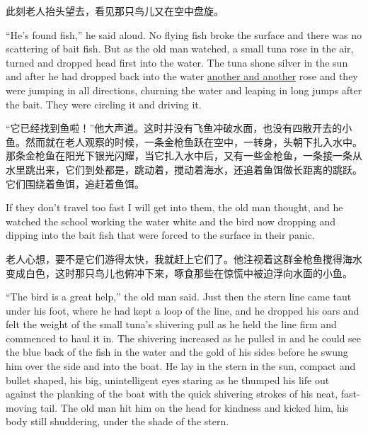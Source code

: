 \begin{paracol}{2}
\switchcolumn

此刻老人抬头望去，看见那只鸟儿又在空中盘旋。

\switchcolumn*

``He's found fish,'' he said aloud. No flying fish broke the surface and there
was no \gls{scattering} of bait fish. But as the old man watched, a small tuna
rose in the air, turned and dropped head first into the water. The tuna
\gls{shone} \gls{silver} in the sun and after he had dropped back into the water
\uline{another and another} rose and they were jumping in all \glspl{direction},
\gls{churning} the water and \gls{leaping} in long jumps after the bait. They
were circling it and driving it.

\switchcolumn

“它已经找到鱼啦！”他大声道。这时并没有飞鱼冲破水面，也没有四散开去的小鱼。然而就在老人观察的时候，一条金枪鱼跃在空中，一转身，头朝下扎入水中。那条金枪鱼在阳光下银光闪耀，当它扎入水中后，又有一些金枪鱼，一条接一条从水里跳出来，它们到处都是，跳动着，搅动着海水，还追着鱼饵做长距离的跳跃。它们围绕着鱼饵，追赶着鱼饵。

\switchcolumn*

If they don't travel too fast I will get into them, the old man thought, and
he watched the school working the water white and the bird now dropping and
dipping into the bait fish that were forced to the surface in their \gls{panic}.

\switchcolumn

老人心想，要不是它们游得太快，我就赶上它们了。他注视着这群金枪鱼搅得海水变成白色，这时那只鸟儿也俯冲下来，啄食那些在惊慌中被迫浮向水面的小鱼。

\switchcolumn*

``The bird is a great help,'' the old man said. Just then the stern line
came \gls{taut} under his foot, where he had kept a loop of the line, and he
dropped his oars and felt the weight of the small tuna's shivering
\gls{pull} as he held the line firm and \gls{commenced} to \gls{haul} it in.
The shivering increased as he pulled in and he could see the blue back of
the fish in the water and the gold of his sides before he swung him over the
side and into the boat. He lay in the stern in the sun, \gls{compact} and
\gls{bullet} shaped, his big, \gls{unintelligent} eyes staring as he
\gls{thumped} his life out against the \gls{planking} of the boat with the
quick shivering \glspl{stroke} of his \gls{neat}, fast-moving tail. The old
man hit him on the head for \gls{kindness} and kicked him, his body still
\gls{shuddering}, under the shade of the stern.


\end{paracol}
